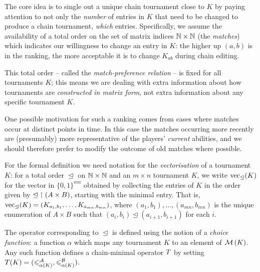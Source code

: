 The core idea is to single out a unique chain tournament close to $K$ by paying
attention to not only the \emph{number} of entries in $K$ that need to be
changed to produce a chain tournament, \emph{which} entries. Specifically, we
assume the availability of a total order on the set of matrix indices $\mathbb{N}
\times \mathbb{N}$ (the \emph{matches}) which indicates our willingness to change an
entry in $K$: the higher up $(a, b)$ is in the ranking, the more acceptable it
is to change $K_{ab}$ during chain editing.

This total order -- called the \emph{match-preference relation} -- is fixed for
all tournaments $K$; this means we are dealing with extra information about how
tournaments are \emph{constructed in matrix form}, not extra information about
any specific tournament $K$.

One possible motivation for such a ranking comes from cases where matches occur
at distinct points in time. In this case the matches occurring more recently
are (presumably) more representative of the players' \emph{current} abilities,
and we should therefore prefer to modify the outcome of old matches where
possible.

For the formal definition we need notation for the \emph{vectorisation} of a
tournament $K$: for a total order ${\trianglelefteq}$ on $\mathbb{N} \times \mathbb{N}$ and an
$m \times n$ tournament $K$, we write $\operatorname{vec}_{\trianglelefteq}(K)$ for the
vector in $\{0,1\}^{mn}$ obtained by collecting the entries of $K$ in the order
given by ${\trianglelefteq} \upharpoonright (A \times B)$,\footnotemark{} starting with the
minimal entry. That is, $\operatorname{vec}_{\trianglelefteq}(K) = (K_{a_1,b_1}, \ldots,
K_{a_{mn},b_{mn}})$, where $(a_1,b_1), \ldots, (a_{mn},b_{mn})$ is the unique
enumeration of $A \times B$ such that $(a_i,b_i) \trianglelefteq
(a_{i+1},b_{i+1})$ for each $i$.


The operator corresponding to $\trianglelefteq$ is defined using the notion of
a \emph{choice function}: a function $\alpha$ which maps any tournament $K$ to
an element of $\operatorname{\mathcal{M}}\left({K}\right)$. Any such function defines a chain-minimal operator
$T$ by setting $T(K) = ({\leqslant^{\mathcal{A}}_{\alpha(K)}}, {\leqslant^{\mathcal{B}}_{\alpha(K)}})$.

